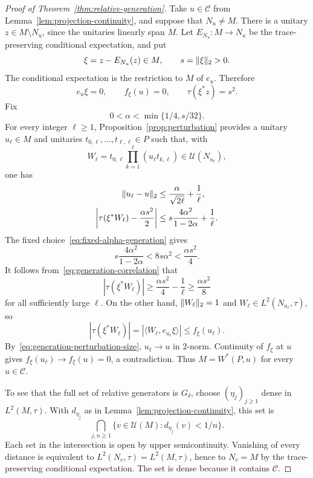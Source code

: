 \begin{proof}[Proof of Theorem~\ref{thm:relative-generation}]
Take $u\in\mathcal C$ from Lemma~\ref{lem:projection-continuity},
and suppose that $N_u\ne M$. There is a unitary $z\in M\setminus N_u$,
since the unitaries linearly span $M$. Let $E_{N_u}:M\to N_u$ be the
trace-preserving conditional expectation, and put
\[
 \xi=z-E_{N_u}(z)\in M,\qquad s=\lVert \xi\rVert_2>0.
\]
The conditional expectation is the restriction to $M$ of $e_u$.
Therefore
\[
 e_u\xi=0,\qquad f_\xi(u)=0,\qquad
 \tau(\xi^*z)=s^2.
\]
Fix
\begin{equation}
 \label{eq:fixed-alpha-generation}
 0<\alpha<\min\{1/4,s/32\}.
\end{equation}
For every integer $\ell\geq1$, Proposition~\ref{prop:perturbation}
provides a unitary $u_\ell\in M$ and unitaries
$t_{0,\ell},\ldots,t_{\ell,\ell}\in P$ such that, with
\[
 W_\ell=t_{0,\ell}\prod_{k=1}^\ell(u_\ell t_{k,\ell})\in\mathcal U(N_{u_\ell}),
\]
one has
\begin{align}
 \lVert u_\ell-u\rVert_2
 &\leq\frac{\alpha}{\sqrt{2\ell}}+\frac1\ell,
 \label{eq:generation-perturbation-size}\\
 \left|\tau(\xi^*W_\ell)-\frac{\alpha s^2}{2}\right|
 &\leq s\frac{4\alpha^2}{1-2\alpha}+\frac1\ell.
 \label{eq:generation-correlation}
\end{align}
The fixed choice~\eqref{eq:fixed-alpha-generation} gives
\[
 s\frac{4\alpha^2}{1-2\alpha}
 <8s\alpha^2<\frac{\alpha s^2}{4}.
\]
It follows from~\eqref{eq:generation-correlation} that
\[
 |\tau(\xi^*W_\ell)|\geq\frac{\alpha s^2}{4}-\frac1\ell
 \geq\frac{\alpha s^2}{8}
\]
for all sufficiently large $\ell$. On the other hand,
$\lVert W_\ell\rVert_2=1$ and $W_\ell\in L^2(N_{u_\ell},\tau)$, so
\[
 |\tau(\xi^*W_\ell)|
 =|\langle W_\ell,e_{u_\ell}\xi\rangle|
 \leq f_\xi(u_\ell).
\]
By~\eqref{eq:generation-perturbation-size}, $u_\ell\to u$ in
$2$-norm. Continuity of $f_\xi$ at $u$ gives
$f_\xi(u_\ell)\to f_\xi(u)=0$, a contradiction. Thus
$M=W^*(P,u)$ for every $u\in\mathcal C$.

To see that the full set of relative generators is $G_\delta$, choose
$(\eta_j)_{j\geq1}$ dense in $L^2(M,\tau)$. With $d_{\eta_j}$ as in
Lemma~\ref{lem:projection-continuity}, this set is
\[
 \bigcap_{j,n\geq1}\{v\in\mathcal U(M):d_{\eta_j}(v)<1/n\}.
\]
Each set in the intersection is open by upper semicontinuity.
Vanishing of every distance is equivalent to
$L^2(N_v,\tau)=L^2(M,\tau)$, hence to $N_v=M$ by the
trace-preserving conditional expectation. The set is dense because
it contains $\mathcal C$.
\end{proof}

